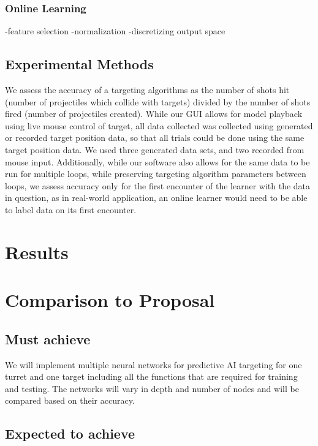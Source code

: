 \documentclass[11pt,letterpaper]{article}
\begin{document}
\subsubsection{Online Learning}



-feature selection
-normalization
-discretizing output space

\subsection{Experimental Methods}
We assess the accuracy of a targeting algorithms as the number of shots hit (number of projectiles which collide with targets) divided by the number of shots fired (number of projectiles created). While our GUI allows for model playback using live mouse control of target, all data collected was collected using generated or recorded target position data, so that all trials could be done using the same target position data. We used three generated data sets, and two recorded from mouse input. Additionally, while our software also allows for the same data to be run for multiple loops, while preserving targeting algorithm parameters between loops, we assess accuracy only for the first encounter of the learner with the data in question, as in real-world application, an online learner would need to be able to label data on its first encounter.

\section{Results}


\section{Comparison to Proposal}
\subsection{Must achieve}

We will implement multiple neural networks for predictive AI targeting for one turret and one target including all the functions that are required for training and testing. The networks will vary in depth and number of nodes and will be compared based on their accuracy.

\subsection{Expected to achieve}
\end{document}
